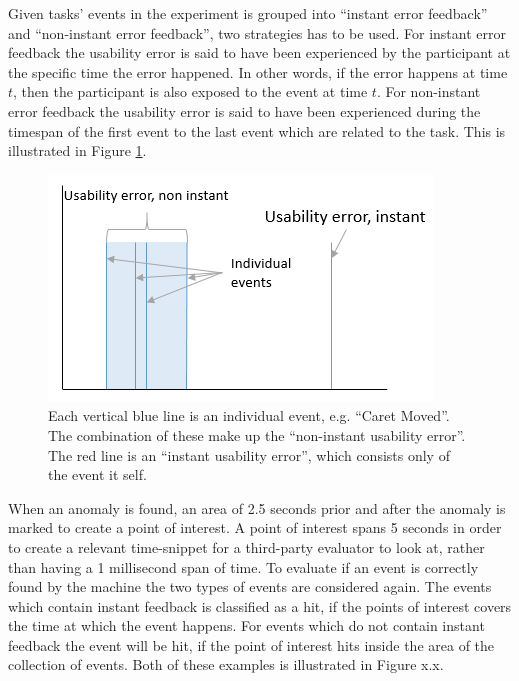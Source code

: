 Given tasks' events in the experiment is grouped into ``instant error feedback'' and ``non-instant error feedback'', two strategies has to be used. 
For instant error feedback the usability error is said to have been experienced by the participant at the specific time the error happened. In other words, if the error happens at time $t$, then the participant is also exposed to the event at time $t$.
For non-instant error feedback the usability error is said to have been experienced during the timespan of the first event to the last event which are related to the task. This is illustrated in Figure \ref{[FIGURE] non-instant illustration}.
\begin{figure}
    \centering
  \includegraphics[width=0.75\columnwidth]{graphics/non-instant.png}
    \caption{Each vertical blue line is an individual event, e.g. ``Caret Moved''. The combination of these make up the ``non-instant usability error''. The red line is an ``instant usability error'', which consists only of the event it self.}
    \label{[FIGURE] non-instant illustration}
\end{figure}
When an anomaly is found, an area of 2.5 seconds prior and after the anomaly is marked to create a point of interest. 
A point of interest spans 5 seconds in order to create a relevant time-snippet for a third-party evaluator to look at, rather than having a 1 millisecond span of time.
To evaluate if an event is correctly found by the machine the two types of events are considered again.
The events which contain instant feedback is classified as a hit, if the points of interest covers the time at which the event happens.
For events which do not contain instant feedback the event will be hit, if the point of interest hits inside the area of the collection of events. Both of these examples is illustrated in Figure x.x. 

